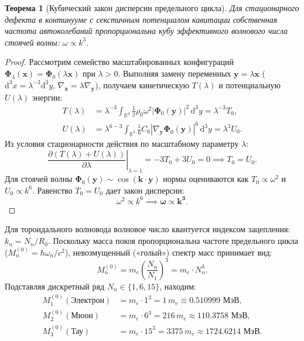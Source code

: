 \documentclass[11pt,a4paper]{article}
\newtheorem{theorem}{Теорема}[section]
\theoremstyle{definition}
\theoremstyle{remark}
\begin{document}
\begin{theorem}[Кубический закон дисперсии предельного цикла]
Для стационарного дефекта в континууме с секстичным потенциалом кавитации собственная частота автоколебаний пропорциональна кубу эффективного волнового числа стоячей волны: $\omega \propto k^3$.
\end{theorem}

\begin{proof}
Рассмотрим семейство масштабированных конфигураций $\boldsymbol{\Phi}_\lambda(\mathbf{x}) = \boldsymbol{\Phi}_0(\lambda \mathbf{x})$ при $\lambda > 0$. Выполняя замену переменных $\mathbf{y} = \lambda \mathbf{x}$ ($\mathrm{d}^3 x = \lambda^{-3} \mathrm{d}^3 y$, $\nabla_\mathbf{x} = \lambda \nabla_\mathbf{y}$), получаем кинетическую $T(\lambda)$ и потенциальную $U(\lambda)$ энергии:
\begin{align}
    T(\lambda) &= \lambda^{-3} \int_{\mathbb{R}^3} \frac{1}{2} \rho_0 \omega^2 |\boldsymbol{\Phi}_0(\mathbf{y})|^2 \, \mathrm{d}^3 y = \lambda^{-3} T_0, \\
    U(\lambda) &= \lambda^{6 - 3} \int_{\mathbb{R}^3} \frac{1}{6} C_6 |\nabla_\mathbf{y} \boldsymbol{\Phi}_0(\mathbf{y})|^6 \, \mathrm{d}^3 y = \lambda^3 U_0.
\end{align}
Из условия стационарности действия по масштабному параметру $\lambda$:
\begin{equation}
    \left. \frac{\partial (T(\lambda) + U(\lambda))}{\partial \lambda} \right|_{\lambda=1} = -3 T_0 + 3 U_0 = 0 \implies T_0 = U_0.
\end{equation}
Для стоячей волны $\boldsymbol{\Phi}_0(\mathbf{y}) \sim \cos(\mathbf{k} \cdot \mathbf{y})$ нормы оцениваются как $T_0 \propto \omega^2$ и $U_0 \propto k^6$. Равенство $T_0 = U_0$ дает закон дисперсии:
\begin{equation}
    \omega^2 \propto k^6 \implies \boldsymbol{\omega \propto k^3}.
\end{equation}
\end{proof}

Для тороидального волновода волновое число квантуется индексом зацепления: $k_n = N_n / R_0$. Поскольку масса покоя пропорциональна частоте предельного цикла ($M_n^{(0)} = \hbar \omega_n / c^2$), невозмущенный («голый») спектр масс принимает вид:
\begin{equation}
    M_n^{(0)} = m_e \left( \frac{N_n}{N_1} \right)^3 = m_e \cdot N_n^3.
    \label{eq:bare_masses}
\end{equation}
Подставляя дискретный ряд $N_n \in \{1, 6, 15\}$, находим:
\begin{align}
    M_1^{(0)} (\text{Электрон}) &= m_e \cdot 1^3 = 1 \, m_e \equiv 0.510999 \text{ МэВ}, \\
    M_2^{(0)} (\text{Мюон})     &= m_e \cdot 6^3 = 216 \, m_e \approx 110.3758 \text{ МэВ}, \\
    M_3^{(0)} (\text{Тау})      &= m_e \cdot 15^3 = 3375 \, m_e \approx 1724.6214 \text{ МэВ}.
\end{align}
\end{document}

